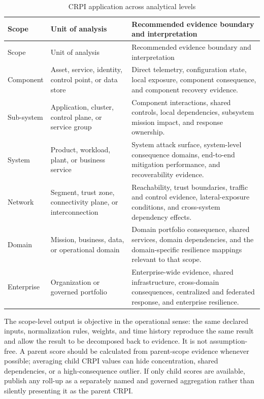 \documentclass[11pt]{article}
\begin{document}
\begin{longtable}{p{} p{} p{}}
  \caption{CRPI application across analytical levels}
  \label{tab:scope-levels}\\
  \toprule
  Scope & Unit of analysis & Recommended evidence boundary and interpretation \\
  \midrule
  \endfirsthead
  \toprule
  Scope & Unit of analysis & Recommended evidence boundary and interpretation \\
  \midrule
  \endhead
  Component & Asset, service, identity, control point, or data store & Direct telemetry, configuration state, local exposure, component consequence, and component recovery evidence. \\
  Sub-system & Application, cluster, control plane, or service group & Component interactions, shared controls, local dependencies, subsystem mission impact, and response ownership. \\
  System & Product, workload, plant, or business service & System attack surface, system-level consequence domains, end-to-end mitigation performance, and recoverability evidence. \\
  Network & Segment, trust zone, connectivity plane, or interconnection & Reachability, trust boundaries, traffic and control evidence, lateral-exposure conditions, and cross-system dependency effects. \\
  Domain & Mission, business, data, or operational domain & Domain portfolio consequence, shared services, domain dependencies, and the domain-specific resilience mappings relevant to that scope. \\
  Enterprise & Organization or governed portfolio & Enterprise-wide evidence, shared infrastructure, cross-domain consequences, centralized and federated response, and enterprise resilience. \\
  \bottomrule
\end{longtable}

The scope-level output is objective in the operational sense: the same declared inputs,
normalization rules, weights, and time history reproduce the same result and allow the
result to be decomposed back to evidence. It is not assumption-free. A parent score
should be calculated from parent-scope evidence whenever possible; averaging child CRPI
values can hide concentration, shared dependencies, or a high-consequence outlier. If
only child scores are available, publish any roll-up as a separately named and governed
aggregation rather than silently presenting it as the parent CRPI.
\end{document}
